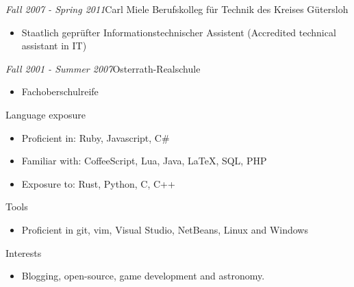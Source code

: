 \documentclass[12pt]{article}
\begin{document}
\emph{Fall 2007 - Spring 2011}\hfill Carl Miele Berufskolleg für Technik des Kreises Gütersloh
\begin{itemize}
  \setlength{\itemsep}{0cm}
  \setlength{\parskip}{0.1cm}
  \item[] Staatlich geprüfter Informationstechnischer Assistent (Accredited technical assistant in IT)
\end{itemize}

\emph{Fall 2001 - Summer 2007}\hfill Osterrath-Realschule
\begin{itemize}
  \setlength{\itemsep}{0cm}
  \setlength{\parskip}{0.1cm}
  \item[] Fachoberschulreife
\end{itemize}

\vspace{0.5cm}
{\Large Language exposure}
\begin{itemize}
  \setlength{\itemsep}{0cm}
  \setlength{\parskip}{0cm}
  \item[] Proficient in: Ruby, Javascript, C\#
  \item[] Familiar with: CoffeeScript, Lua, Java, LaTeX, SQL, PHP
  \item[] Exposure to: Rust, Python, C, C++
\end{itemize}

\vspace{0.5cm}
{\Large Tools}
\begin{itemize}
  \setlength{\itemsep}{0cm}
  \setlength{\parskip}{0cm}
  \item[] Proficient in git, vim, Visual Studio, NetBeans, Linux and Windows
\end{itemize}

\vspace{0.5cm}
{\Large Interests}
\begin{itemize}
  \setlength{\itemsep}{0cm}
  \setlength{\parskip}{0cm}
  \item[] Blogging, open-source, game development and astronomy.
\end{itemize}
\end{document}
